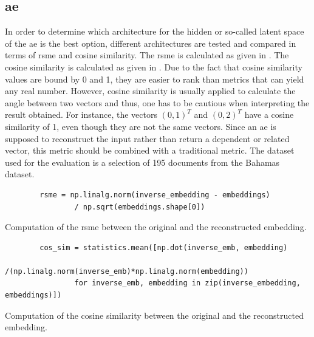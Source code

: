 \subsection*{\ac{ae}}\label{subsec:evaluation-ae}

In order to determine which architecture for the hidden or so-called latent space of the \ac{ae} is the best option, 
different architectures are tested and compared in terms of \ac{rsme} and cosine similarity.
The \ac{rsme} is calculated as given in .
The cosine similarity is calculated as given in .
Due to the fact that cosine similarity values are bound by 0 and 1, they are easier to rank than metrics that can yield any real number.
However, cosine similarity is usually applied to calculate the angle between two vectors and thus, one has to be cautious when interpreting the result obtained.
For instance, the vectors $\left( 0, 1 \right)^T$ and $\left( 0, 2 \right)^T$ have a cosine similarity of 1, even though they are not the same vectors.
Since an \ac{ae} is supposed to reconstruct the input rather than return a dependent or related vector, this metric should be combined with a traditional metric.
The dataset used for the evaluation is a selection of 195 documents from the Bahamas dataset.

\begin{listing}[htp]
    \begin{verbatim}
        rsme = np.linalg.norm(inverse_embedding - embeddings) 
                / np.sqrt(embeddings.shape[0])
    \end{verbatim}
    \caption[Computation of the \acs*{rsme}]{
        Computation of the \acs*{rsme} between the original and the reconstructed embedding.
    }
    \label{lst:impl-rsme}
\end{listing}

\begin{listing}[htp]
    \begin{verbatim}
        cos_sim = statistics.mean([np.dot(inverse_emb, embedding)
                /(np.linalg.norm(inverse_emb)*np.linalg.norm(embedding)) 
                for inverse_emb, embedding in zip(inverse_embedding, embeddings)])
    \end{verbatim}
    \caption[Computation of the cosine similarity]{
        Computation of the cosine similarity between the original and the reconstructed embedding.
    }
    \label{lst:impl-cos_sim}
\end{listing}

